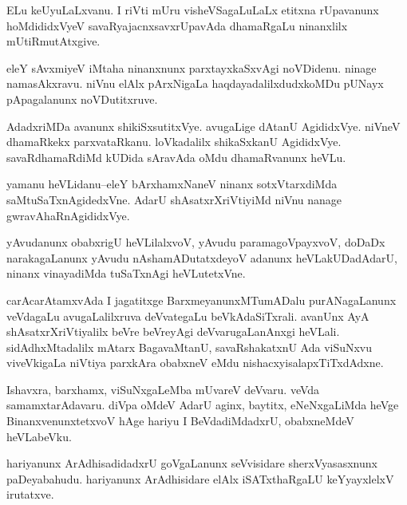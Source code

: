 \documentclass{article}
\begin{document}
\begin{mn}%
ELu keUyuLaLxvanu. I riVti mUru visheVSagaLuLaLx etitxna rUpavanunx hoMdididxVyeV 
savaRyajacnxsavxrUpavAda dhamaRgaLu ninanxlilx mUtiRmutAtxgive.
\end{mn}

\begin{mn}%
eleY sAvxmiyeV iMtaha ninanxnunx parxtayxkaSxvAgi noVDidenu. ninage namasAkxravu. niVnu 
elAlx pArxNigaLa haqdayadalilxdudxkoMDu pUNayx pApagalanunx noVDutitxruve.
\end{mn}

\begin{mn}%
AdadxriMDa avanunx shikiSxsutitxVye. avugaLige dAtanU AgididxVye. niVneV dhamaRkekx 
parxvataRkanu. loVkadalilx shikaSxkanU AgididxVye. savaRdhamaRdiMd kUDida sAravAda oMdu 
dhamaRvanunx heVLu.
\end{mn}

\begin{mn}%
yamanu heVLidanu--eleY bArxhamxNaneV ninanx sotxVtarxdiMda saMtuSaTxnAgidedxVne. AdarU 
shAsatxrXriVtiyiMd niVnu nanage gwravAhaRnAgididxVye.
\end{mn}

\begin{mn}%
yAvudanunx obabxrigU heVLilalxvoV, yAvudu paramagoVpayxvoV, doDaDx narakagaLanunx yAvudu 
nAshamADutatxdeyoV adanunx heVLakUDadAdarU, ninanx vinayadiMda tuSaTxnAgi heVLutetxVne.
\end{mn}

\begin{mn}%
carAcarAtamxvAda I jagatitxge BarxmeyanunxMTumADalu purANagaLanunx veVdagaLu 
avugaLalilxruva deVvategaLu beVkAdaSiTxrali. avanUnx AyA shAsatxrXriVtiyalilx beVre 
beVreyAgi deVvarugaLanAnxgi heVLali. sidAdhxMtadalilx mAtarx BagavaMtanU, savaRshakatxnU 
Ada viSuNxvu viveVkigaLa niVtiya parxkAra obabxneV eMdu nishacxyisalapxTiTxdAdxne.
\end{mn}

\begin{mn}%
Ishavxra, barxhamx, viSuNxgaLeMba mUvareV deVvaru. veVda samamxtarAdavaru. diVpa oMdeV 
AdarU aginx, baytitx, eNeNxgaLiMda heVge BinanxvenunxtetxvoV hAge hariyu I 
BeVdadiMdadxrU, obabxneMdeV heVLabeVku.
\end{mn}

\begin{mn}%
hariyanunx ArAdhisadidadxrU goVgaLanunx seVvisidare sherxVyasasxnunx paDeyabahudu. 
hariyanunx ArAdhisidare elAlx iSATxthaRgaLU keYyayxlelxV irutatxve.
\end{mn}
\end{document}
